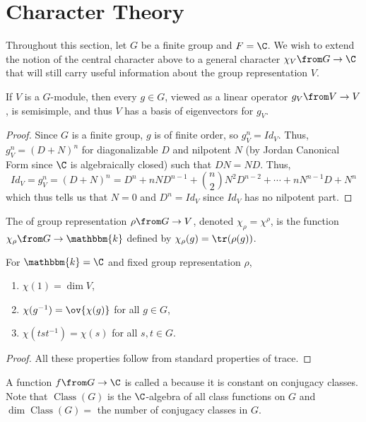 \documentclass[11pt,leqno,oneside]{amsbook}
\newcommand{\bbk}{\mathbbm{k}}
\numberwithin{thm}{section}
\begin{document}
\section{Character Theory}
Throughout this section, let \(G\) be a finite group and \(F =
\C\). We wish to extend the notion of the central character above to a
general character \(\chi_V \from G \to \C\) that will still carry
useful information about the group representation \(V\).
\begin{prop}
  If \(V\) is a \(G\)-module, then every \(g \in G\), viewed as a
  linear operator \(g_V \from V \to V\), is semisimple, and thus \(V\)
  has a basis of eigenvectors for \(g_V\).
\end{prop}
\begin{proof}
  Since \(G\) is a finite group, \(g\) is of finite order, so \(g_V^n
  = Id_V\). Thus, \(g_V^n = (D+N)^n\) for diagonalizable \(D\) and
  nilpotent \(N\) (by Jordan Canonical Form since \(\C\) is
  algebraically closed) such that \(DN = ND\). Thus, \[
    Id_V = g_V^n = (D+N)^n = D^n + nND^{n-1} + \binom{n}{2} N^2 D^{n-2} +
    \cdots + nN^{n-1}D + N^n 
  \]
  which thus tells us that \(N = 0\) and \(D^n = Id_V\) since \(Id_V\)
  has no nilpotent part.
\end{proof}
\begin{defn}
  The  of group representation \(\rho \from G \to V\), denoted \(\chi_\rho = \chi^\rho\), is the function
  \(\chi_\rho \from G \to \bbk\) defined by \(\chi_\rho(g) =
  \tr(\rho(g))\).
\end{defn}
\begin{prop}
  For \(\bbk = \C\) and fixed group representation \(\rho\),
  \begin{enumerate}
  \item \(\chi(1) = \dim V\),
  \item \(\chi(g^{-1}) = \ov{\chi(g)}\) for all \(g \in G\),
  \item \(\chi(tst^{-1}) = \chi(s)\) for all \(s,t \in G\).
  \end{enumerate}
\end{prop}
\begin{proof}
  All these properties follow from standard properties of trace.
\end{proof}
\begin{defn}
  A function \(f \from G \to \C\) is called a 
  because it is constant on conjugacy classes. Note that
  \(\operatorname{Class}(G)\) is the \(\C\)-algebra of all class
  functions on \(G\) and \(\dim \operatorname{Class}(G) =\) the number
  of conjugacy classes in \(G\).
\end{defn}
\end{document}
